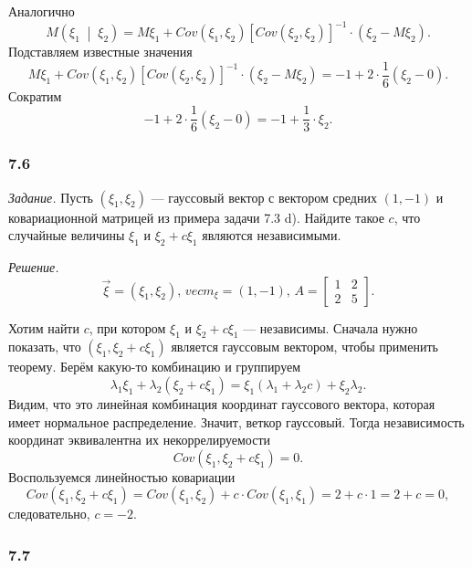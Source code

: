 \begin{enumerate}[label=\alph*)]
  Аналогично
  $$M \left( \xi_1 \; \middle| \; \xi_2 \right) =
    M \xi_1 +
    Cov \left( \xi_1, \xi_2 \right) \left[ Cov \left( \xi_2, \xi_2 \right) \right]^{-1} \cdot
    \left( \xi_2 - M \xi_2 \right).$$
  Подставляем известные значения
  $$M \xi_1 +
    Cov \left( \xi_1, \xi_2 \right) \left[ Cov \left( \xi_2, \xi_2 \right) \right]^{-1} \cdot
    \left( \xi_2 - M \xi_2 \right) =
    -1 + 2 \cdot \frac{1}{6} \left( \xi_2 - 0 \right).$$
  Сократим
  $$-1 + 2 \cdot \frac{1}{6} \left( \xi_2 - 0 \right) =
    -1 + \frac{1}{3} \cdot \xi_2.$$
\end{enumerate}

\subsubsection*{7.6}

\textit{Задание.}
Пусть $ \left( \xi_1, \xi_2 \right) $ ---
гауссовый вектор с вектором средних $ \left( 1, -1 \right) $
и ковариационной матрицей из примера задачи 7.3 d).
Найдите такое $c$, что случайные величины $ \xi_1$ и $ \xi_2 + c \xi_1$ являются независимыми.

\textit{Решение.}
$$ \vec{ \xi } = \left( \xi_1, \xi_2 \right), \,
  vec{m}_{ \xi } = \left(1, -1 \right), \,
  A =
  \begin{bmatrix}
    1 & 2 \\
    2 & 5
  \end{bmatrix}.$$

Хотим найти $c$, при котором $ \xi_1$ и $ \xi_2 + c \xi_1$ --- независимы.
Сначала нужно показать, что $ \left( \xi_1, \xi_2 + c \xi_1 \right) $ является гауссовым вектором,
чтобы применить теорему.
Берём какую-то комбинацию и группируем
$$ \lambda_1 \xi_1 + \lambda_2 \left( \xi_2 + c \xi_1 \right) =
  \xi_1 \left( \lambda_1 + \lambda_2 c \right) + \xi_2 \lambda_2.$$
Видим, что это линейная комбинация координат гауссового вектора,
которая имеет нормальное распределение.
Значит, веткор гауссовый.
Тогда независимость координат эквивалентна их некоррелируемости
$$Cov \left( \xi_1, \xi_2 + c \xi_1 \right) =
  0.$$
Воспользуемся линейностью ковариации
$$Cov \left( \xi_1, \xi_2 + c \xi_1 \right) =
  Cov \left( \xi_1, \xi_2 \right) + c \cdot Cov \left( \xi_1, \xi_1 \right) =
  2 + c \cdot 1 =
  2 + c =
  0,$$
следовательно, $c = -2$.

\subsubsection{7.7}

